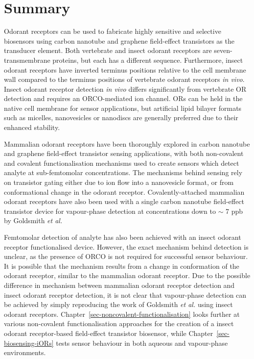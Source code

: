 \documentclass[
  a4paper,
]{scrbook}
\begin{document}
\hypertarget{summary-1}{%
\section{Summary}\label{summary-1}}

Odorant receptors can be used to fabricate highly sensitive and
selective biosensors using carbon nanotube and graphene field-effect
transistors as the transducer element. Both vertebrate and insect
odorant receptors are seven-transmembrane proteins, but each has a
different sequence. Furthermore, insect odorant receptors have inverted
terminus positions relative to the cell membrane wall compared to the
terminus positions of vertebrate odorant receptors \emph{in vivo}.
Insect odorant receptor detection \emph{in vivo} differs significantly
from vertebrate OR detection and requires an ORCO-mediated ion channel.
ORs can be held in the native cell membrane for sensor applications, but
artificial lipid bilayer formats such as micelles, nanovesicles or
nanodiscs are generally preferred due to their enhanced stability.

Mammalian odorant receptors have been thoroughly explored in carbon
nanotube and graphene field-effect transistor sensing applications, with
both non-covalent and covalent functionalisation mechanisms used to
create sensors which detect analyte at sub-femtomolar concentrations.
The mechanisms behind sensing rely on transistor gating either due to
ion flow into a nanovesicle format, or from conformational change in the
odorant receptor. Covalently-attached mammalian odorant receptors have
also been used with a single carbon nanotube field-effect transistor
device for vapour-phase detection at concentrations down to \(\sim\) 7
ppb by Goldsmith \emph{et al.}

Femtomolar detection of analyte has also been achieved with an insect
odorant receptor functionalised device. However, the exact mechanism
behind detection is unclear, as the presence of ORCO is not required for
successful sensor behaviour. It is possible that the mechanism results
from a change in conformation of the odorant receptor, similar to the
mammalian odorant receptor. Due to the possible difference in mechanism
between mammalian odorant receptor detection and insect odorant receptor
detection, it is not clear that vapour-phase detection can be achieved
by simply reproducing the work of Goldsmith \emph{et al.} using insect
odorant receptors. Chapter~\ref{sec-noncovalent-functionalisation} looks
further at various non-covalent functionalisation approaches for the
creation of a insect odorant receptor-based field-effect transistor
biosensor, while Chapter~\ref{sec-biosensing-iORs} tests sensor
behaviour in both aqueous and vapour-phase environments.
\end{document}
